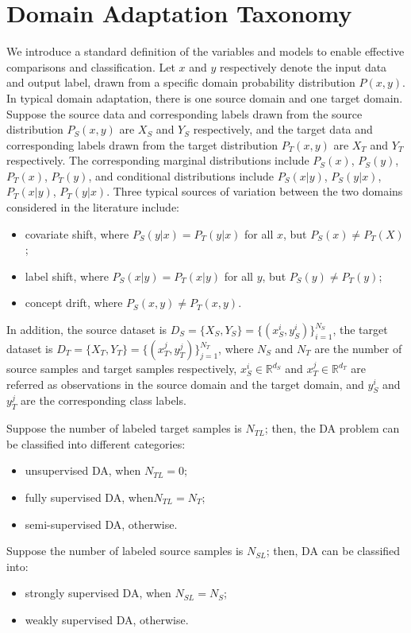 \documentclass[conference]{IEEEtran}
\begin{document}
\section{Domain Adaptation Taxonomy}
We introduce a standard definition of the variables and models to 
enable effective comparisons and classification. 
Let $x$ and $y$ respectively denote the input data and output label, 
drawn from a specific domain probability distribution $P(x,y)$.
In typical domain adaptation, there is one source domain and one
target domain. 
Suppose the source data and corresponding labels drawn 
from the source distribution $P_S(x,y)$ are $X_S$ and $Y_S$ respectively, 
and the target data and corresponding labels drawn from the target 
distribution $P_T(x,y)$ are $X_T$ and $Y_T$ respectively.
The corresponding marginal distributions include $P_S(x)$, $P_S(y)$,
$P_T(x)$, $P_T(y)$, and conditional distributions include 
$P_S(x|y)$, $P_S(y|x)$, $P_T(x|y)$, $P_T(y|x)$. 
Three typical sources of variation between the two domains considered 
in the literature include:
\begin{itemize}
    \item covariate shift, where $P_S(y|x) = P_T(y|x)$ for all $x$, 
    but $P_S(x) \neq P_T(X)$;
    \item label shift, where $P_S(x|y) = P_T(x|y)$ for all $y$, but 
    $P_S(y) \neq P_T(y)$;
    \item concept drift, where $P_S(x,y) \neq P_T(x,y)$.
 \end{itemize}
 In addition, the source dataset is $D_S = \{X_S, Y_S\} = \{(x^i_S,y^i_S )\}_{i=1}^{N_S}$,
the target dataset is $D_T = \{X_T, Y_T\} = \{(x_T^j, y_T^j)\}_{j=1}^{N_T}$,
where $N_S$ and $N_T$ are the number of source samples and target samples 
respectively, $x^i_S \in \mathbb{R}^{d_S}$ and $x^j_T \in \mathbb{R}^{d_T}$
are referred as observations in the source domain and the target domain,
and $y^i_S$ and $y^j_T$ are the corresponding class labels.

Suppose the number of labeled target samples is $N_{TL}$; then,
the DA problem can be classified into different categories:
\begin{itemize}
\item unsupervised DA, when $N_{TL}=0$;
\item fully supervised DA, when$N_{TL}=N_T$;
\item semi-supervised DA, otherwise. 
\end{itemize}

Suppose the number of labeled source samples is $N_{SL}$; then,
DA can be classified into:
\begin{itemize}
    \item strongly supervised DA, when $N_{SL} = N_S$;
    \item weakly supervised DA, otherwise.
\end{itemize}
\end{document}
